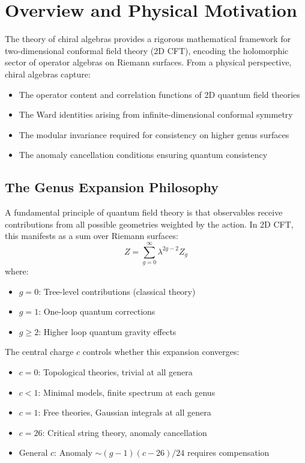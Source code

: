 \section{Overview and Physical Motivation}

The theory of chiral algebras provides a rigorous mathematical framework for two-dimensional
conformal field theory (2D CFT), encoding the holomorphic sector of operator algebras on 
Riemann surfaces. From a physical perspective, chiral algebras capture:

\begin{itemize}
\item The operator content and correlation functions of 2D quantum field theories
\item The Ward identities arising from infinite-dimensional conformal symmetry
\item The modular invariance required for consistency on higher genus surfaces
\item The anomaly cancellation conditions ensuring quantum consistency
\end{itemize}

\subsection{The Genus Expansion Philosophy}

A fundamental principle of quantum field theory is that observables receive contributions
from all possible geometries weighted by the action. In 2D CFT, this manifests as a sum
over Riemann surfaces:
$$Z = \sum_{g=0}^{\infty} \lambda^{2g-2} Z_g$$
where:
\begin{itemize}
\item $g = 0$: Tree-level contributions (classical theory)
\item $g = 1$: One-loop quantum corrections  
\item $g \geq 2$: Higher loop quantum gravity effects
\end{itemize}

The central charge $c$ controls whether this expansion converges:
\begin{itemize}
\item $c = 0$: Topological theories, trivial at all genera
\item $c < 1$: Minimal models, finite spectrum at each genus
\item $c = 1$: Free theories, Gaussian integrals at all genera
\item $c = 26$: Critical string theory, anomaly cancellation
\item General $c$: Anomaly $\sim (g-1)(c-26)/24$ requires compensation
\end{itemize}


